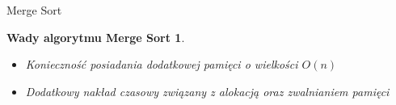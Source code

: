 \begin{frame}[squeeze]{Merge Sort}
	
	\newtheorem*{mergesort*}{Wady algorytmu Merge Sort}
	\begin{mergesort*}
		\begin{itemize}
			\item Konieczność posiadania dodatkowej pamięci o wielkości $O(n)$
			\item Dodatkowy nakład czasowy związany z alokacją oraz zwalnianiem pamięci
		\end{itemize}
	\end{mergesort*}

\end{frame}
